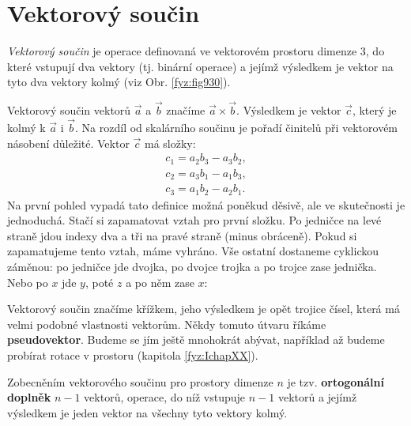   \section{Vektorový součin}\label{fyz:IchapXIsecVII} 
    \emph{Vektorový součin} je operace definovaná ve vektorovém prostoru dimenze 3, do které
    vstupují dva vektory (tj. binární operace) a jejímž výsledkem je vektor na tyto dva vektory
    kolmý (viz Obr. \ref{fyz:fig930}).


    Vektorový součin vektorů \(\vec{a}\) a \(\vec{b}\) značíme \(\vec{a}\times\vec{b}\). Výsledkem
    je vektor \(\vec{c}\), který je kolmý k \(\vec{a}\) i \(\vec{b}\). Na rozdíl od skalárního
    součinu je pořadí činitelů při vektorovém násobení důležité. Vektor \(\vec{c}\) má složky: 
    \begin{subequations}\label{fyz:eq752}
      \begin{align}
        c_1 =a_2b_3−a_3b_2,    \label{fyz:eq752a}  \\
        c_2 =a_3b_1−a_1b_3,    \label{fyz:eq752b}  \\
        c_3 =a_1b_2−a_2b_1.    \label{fyz:eq752c}
      \end{align}
    \end{subequations}
    Na první pohled vypadá tato definice možná poněkud děsivě, ale ve skutečnosti je jednoduchá.
    Stačí si zapamatovat vztah pro první složku. Po jedničce na levé straně jdou indexy dva a tři na
    pravé straně (minus obráceně). Pokud si zapamatujeme tento vztah, máme vyhráno. Vše ostatní
    dostaneme cyklickou záměnou: po jedničce jde dvojka, po dvojce trojka a po trojce zase jednička.
    Nebo po \(x\) jde \(y\), poté \(z\) a po něm zase \(x\): 


    Vektorový součin značíme křížkem, jeho výsledkem je opět trojice čísel, která má velmi podobné
    vlastnosti vektorům. Někdy tomuto útvaru říkáme \textbf{pseudovektor}. Budeme se jím ještě
    mnohokrát abývat, například až budeme probírat rotace v prostoru (kapitola \ref{fyz:IchapXX}).

    Zobecněním vektorového součinu pro prostory dimenze \(n\) je tzv. \textbf{ortogonální doplněk}
    \(n-1\) vektorů, operace, do níž vstupuje \(n − 1\) vektorů a jejímž výsledkem je jeden vektor
    na všechny tyto vektory kolmý.


